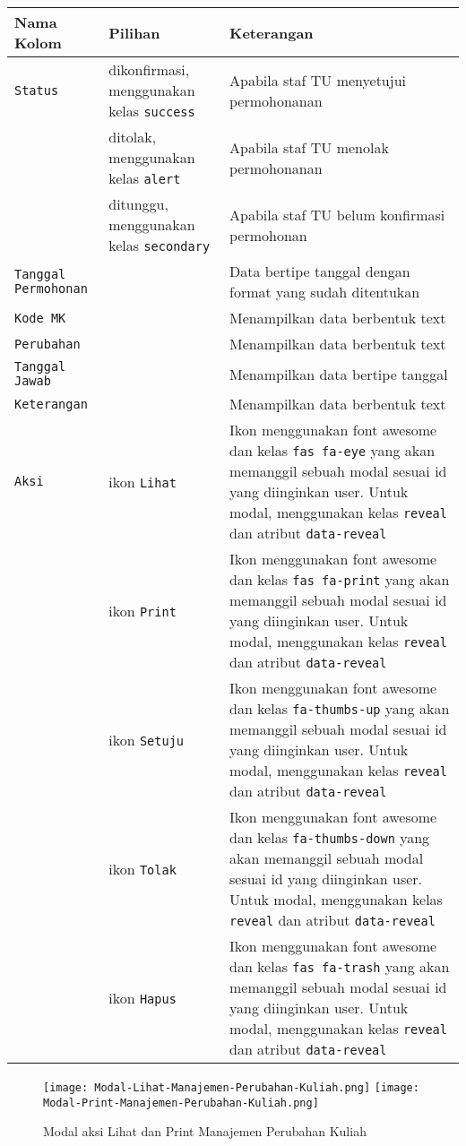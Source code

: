 \begin{tabular}{|p{4cm}|p{2cm}|p{10cm}|}
	\hline
	Nama Kolom & Pilihan & Keterangan\\
	\hline
	\texttt{Status} & dikonfirmasi, menggunakan kelas \colorbox{mygray}{\verb|success|} & Apabila staf TU menyetujui permohonanan\\
	\hline
	&  ditolak, menggunakan kelas \colorbox{mygray}{\verb|alert|}  & Apabila staf TU menolak permohonanan\\
	\hline
	& ditunggu, menggunakan kelas \colorbox{mygray}{\verb|secondary|} &  Apabila staf TU belum konfirmasi permohonan \\
	\hline
	\texttt{Tanggal Permohonan}    & & Data bertipe tanggal dengan format yang sudah ditentukan\\
	\hline
	\texttt{Kode MK} &  & Menampilkan data berbentuk text \\
	\hline
	\texttt{Perubahan} &  & Menampilkan data berbentuk text \\
	\hline
	\texttt{Tanggal Jawab} &  & Menampilkan data bertipe tanggal \\
	\hline
	\texttt{Keterangan} &  & Menampilkan data berbentuk text \\
	\hline
	\texttt{Aksi} & ikon \texttt{Lihat} & Ikon menggunakan font awesome dan kelas  \colorbox{mygray}{\verb|fas fa-eye|} yang akan memanggil sebuah modal sesuai id yang diinginkan user. Untuk modal, menggunakan kelas \texttt{reveal} dan atribut \texttt{data-reveal}\\
	\hline
	& ikon \texttt{Print} & Ikon menggunakan font awesome dan kelas  \colorbox{mygray}{\verb|fas fa-print|} yang akan memanggil sebuah modal sesuai id yang diinginkan user. Untuk modal, menggunakan kelas \texttt{reveal} dan atribut \texttt{data-reveal}\\
	\hline
	& ikon \texttt{Setuju} & Ikon menggunakan font awesome dan kelas  \colorbox{mygray}{\verb|fa-thumbs-up|} yang akan memanggil sebuah modal sesuai id yang diinginkan user. Untuk modal, menggunakan kelas \texttt{reveal} dan atribut \texttt{data-reveal}\\
	\hline
	& ikon \texttt{Tolak} & Ikon menggunakan font awesome dan kelas  \colorbox{mygray}{\verb|fa-thumbs-down|} yang akan memanggil sebuah modal sesuai id yang diinginkan user. Untuk modal, menggunakan kelas \texttt{reveal} dan atribut \texttt{data-reveal}\\
	\hline
	& ikon \texttt{Hapus} & Ikon menggunakan font awesome dan kelas  \colorbox{mygray}{\verb|fas fa-trash|} yang akan memanggil sebuah modal sesuai id yang diinginkan user. Untuk modal, menggunakan kelas \texttt{reveal} dan atribut \texttt{data-reveal}\\	
	\hline
\end{tabular}
\begin{figure} [H]
	\centering  
	\texttt{[image: Modal-Lihat-Manajemen-Perubahan-Kuliah.png]}  
	\texttt{[image: Modal-Print-Manajemen-Perubahan-Kuliah.png]} 
	\caption{Modal aksi Lihat dan Print Manajemen Perubahan Kuliah} 
\end{figure}


